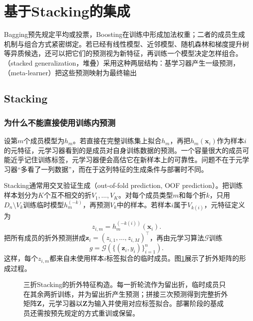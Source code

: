 \section{基于Stacking的集成}
\label{sec:ensemble-stacking}

Bagging预先规定平均或投票，Boosting在训练中形成加法权重；二者的成员生成机制与组合方式紧密绑定。若已经有线性模型、近邻模型、随机森林和梯度提升树等异质候选，还可以把它们的预测视为新特征，再训练一个模型决定怎样组合。（stacked generalization，堆叠）采用这种两层结构：基学习器产生一级预测，（meta-learner）把这些预测映射为最终输出

\subsection{Stacking}
\label{sec:ensemble-stacking-model}

\subsubsection{为什么不能直接使用训练内预测}

设第$m$个成员模型为$h_m$。若直接在完整训练集上拟合$h_m$，再把$h_m(\bm{x}_i)$作为样本$i$的元特征，元学习器看到的是成员对自身训练数据的预测。一个容量很大的成员可能近乎记住训练标签，元学习器便会高估它在新样本上的可靠性。问题不在于元学习器“多看了一列数据”，而在于这列特征的生成条件与部署时不同。

Stacking通常用交叉验证生成（out-of-fold prediction, OOF prediction）。把训练样本划分为$K$个互不相交的折$V_1,\ldots,V_K$。对每个成员类型$m$和每个折$k$，只用$D_n\setminus V_k$训练临时模型$h_m^{(-k)}$，再预测$V_k$中的样本。若样本$i$属于$V_{k(i)}$，元特征定义为
\begin{equation}
  z_{i,m}
  =
  h_m^{(-k(i))}(\bm{x}_i).
  \label{eq:ensemble-oof-feature}
\end{equation}
把所有成员的折外预测拼成$\bm{z}_i=(z_{i,1},\ldots,z_{i,M})^{\top}$，再由元学习算法$\mathcal{G}$训练
\[
  g=\mathcal{G}\!\left(\{(\bm{z}_i,y_i)\}_{i=1}^{n}\right).
\]
这样，每个$z_{i,m}$都来自未使用样本$i$标签拟合的临时成员。图\ref{fig:ensemble-stacking-oof}展示了折外矩阵的形成过程。

\begin{figure}[htbp]
  \centering
  
  \caption{三折Stacking的折外特征构造。每一折轮流作为留出折，临时成员只在其余两折训练，并为留出折产生预测；拼接三次预测得到完整折外矩阵$\bm{Z}$，元学习器以$\bm{Z}$为输入并使用对应标签拟合。部署阶段的基成员还需按预先规定的方式重训或保留。}
  \label{fig:ensemble-stacking-oof}
\end{figure}

